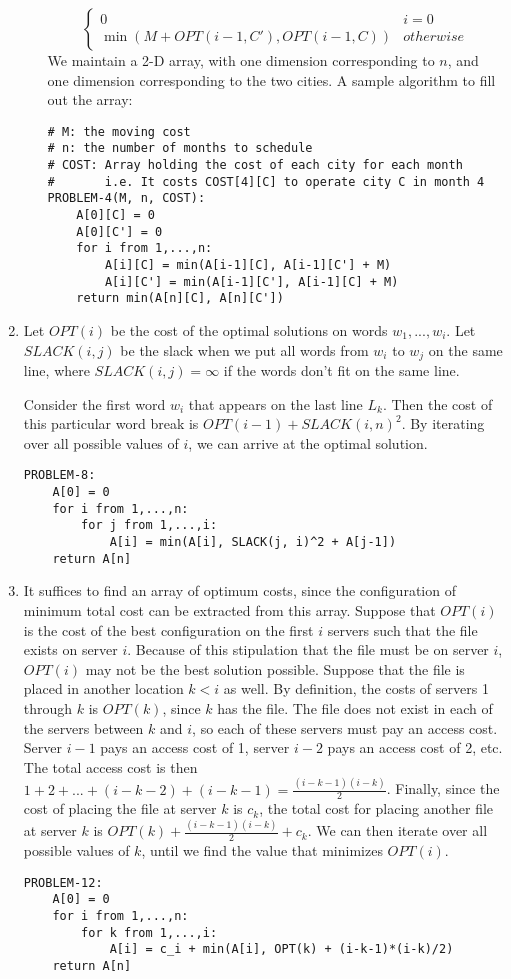 \documentclass[oneside, 12pt]{article}
\begin{document}
\begin{enumerate}
\begin{enumerate}
\[\begin{cases}
0 & i = 0 \\
\min(M + OPT(i-1, C'), OPT(i-1, C)) & otherwise
\end{cases}
\] 
We maintain a 2-D array, with one dimension corresponding to $n$, and one dimension corresponding to the two cities. A sample algorithm to fill out the array:
\begin{lstlisting}
# M: the moving cost
# n: the number of months to schedule
# COST: Array holding the cost of each city for each month
# 	    i.e. It costs COST[4][C] to operate city C in month 4
PROBLEM-4(M, n, COST):
	A[0][C] = 0
	A[0][C'] = 0
	for i from 1,...,n:
		A[i][C] = min(A[i-1][C], A[i-1][C'] + M)
		A[i][C'] = min(A[i-1][C'], A[i-1][C] + M)
	return min(A[n][C], A[n][C'])
\end{lstlisting}
\end{enumerate}
\setcounter{enumi}{5}
\clearpage
\item 
Let $OPT(i)$ be the cost of the optimal solutions on words $w_1,...,w_i$. Let $SLACK(i, j)$ be the slack when we put all words from $w_i$ to $w_j$ on the same line, where $SLACK(i, j) = \infty$ if the words don't fit on the same line.

Consider the first word $w_i$ that appears on the last line $L_k$. Then the cost of this particular word break is $OPT(i-1) + SLACK(i, n)^2$. By iterating over all possible values of $i$, we can arrive at the optimal solution.
\begin{lstlisting}
PROBLEM-8:
	A[0] = 0
	for i from 1,...,n:
		for j from 1,...,i:
			A[i] = min(A[i], SLACK(j, i)^2 + A[j-1])
	return A[n]
\end{lstlisting}
\setcounter{enumi}{11}
\clearpage
\item
It suffices to find an array of optimum costs, since the configuration of minimum total cost can be extracted from this array. Suppose that $OPT(i)$ is the cost of the best configuration on the first $i$ servers such that the file exists on server $i$. Because of this stipulation that the file must be on server $i$, $OPT(i)$ may not be the best solution possible. Suppose that the file is placed in another location $k < i$ as well. By definition, the costs of servers 1 through $k$ is $OPT(k)$, since $k$ has the file. The file does not exist in each of the servers between $k$ and $i$, so each of these servers must pay an access cost. Server $i-1$ pays an access cost of 1, server $i-2$ pays an access cost of 2, etc. The total access cost is then $1 + 2 + ... + (i - k - 2) + (i - k - 1) = \frac{(i-k-1)(i-k)}{2}$. Finally, since the cost of placing the file at server $k$ is $c_k$, the total cost for placing another file at server $k$ is $OPT(k) + \frac{(i-k-1)(i-k)}{2} + c_k$. We can then iterate over all possible values of $k$, until we find the value that minimizes $OPT(i)$.
\begin{lstlisting}
PROBLEM-12:
	A[0] = 0
	for i from 1,...,n:
		for k from 1,...,i:
			A[i] = c_i + min(A[i], OPT(k) + (i-k-1)*(i-k)/2)
	return A[n]
\end{lstlisting}
\end{enumerate}
\end{document}
